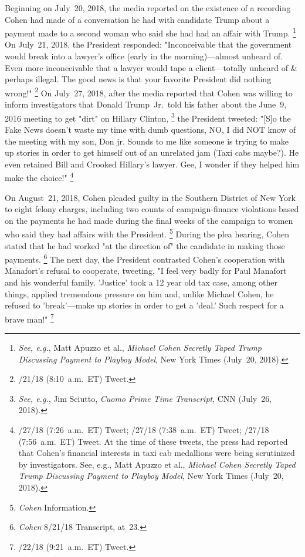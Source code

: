 Beginning on July~20, 2018, the media reported on the existence of a recording Cohen had made of a conversation he had with candidate Trump about a payment made to a second woman who said she had had an affair with Trump.%
\footnote{\textit{See, e.g.}, Matt Apuzzo et al., \textit{Michael Cohen Secretly Taped Trump Discussing Payment to Playboy Model}, New York Times (July~20, 2018).}
On July~21, 2018, the President responded: "Inconceivable that the government would break into a lawyer's office (early in the morning)---almost unheard of.
Even more inconceivable that a lawyer would tape a client---totally unheard of \& perhaps illegal.
The good news is that your favorite President did nothing wrong!"%
\footnote{/21/18 (8:10~a.m.~ET) Tweet.}
On July~27, 2018, after the media reported that Cohen was willing to inform investigators that Donald Trump~Jr.\ told his father about the June~9, 2016 meeting to get "dirt" on Hillary Clinton,%
\footnote{\textit{See, e.g.}, Jim Sciutto, \textit{Cuomo Prime Time Transcript}, CNN (July~26, 2018).}
the President tweeted:
"[S]o the Fake News doesn't waste my time with dumb questions, NO, I did NOT know of the meeting with my son, Don jr.
Sounds to me like someone is trying to make up stories in order to get himself out of an unrelated jam (Taxi cabs maybe?).
He even retained Bill and Crooked Hillary's lawyer.
Gee, I wonder if they helped him make the choice!"%
\footnote{/27/18 (7:26~a.m.~ET) Tweet;
/27/18 (7:38~a.m.~ET) Tweet;
/27/18 (7:56~a.m.~ET) Tweet.
At the time of these tweets, the press had reported that Cohen's financial interests in taxi cab medallions were being scrutinized by investigators.
See, e.g., Matt Apuzzo et al., \textit{Michael Cohen Secretly Taped Trump Discussing Payment to Playboy Model}, New York Times (July~20, 2018).}

On August~21, 2018, Cohen pleaded guilty in the Southern District of New York to eight felony charges, including two counts of campaign-finance violations based on the payments he had made during the final weeks of the campaign to women who said they had affairs with the President.%
\footnote{\textit{Cohen} Information.}
During the plea hearing, Cohen stated that he had worked "at the direction of" the candidate in making those payments.%
\footnote{\textit{Cohen} 8/21/18 Transcript, at~23.}
The next day, the President contrasted Cohen's cooperation with Manafort's refusal to cooperate, tweeting, "I feel very badly for Paul Manafort and his wonderful family.
'Justice' took a 12 year old tax case, among other things, applied tremendous pressure on him and, unlike Michael Cohen, he refused to 'break'---make up stories in order to get a 'deal.'
Such respect for a brave man!"%
\footnote{/22/18 (9:21~a.m.~ET) Tweet.}

